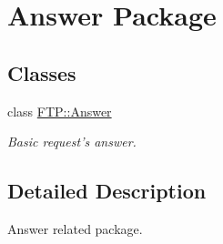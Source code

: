 \hypertarget{group__answer}{\section{Answer Package}
\label{group__answer}
}
\subsection*{Classes}
\begin{DoxyCompactItemize}
\item 
class \hyperlink{classFTP_1_1Answer}{F\-T\-P\-::\-Answer}
\begin{DoxyCompactList}\small\item\em Basic request's answer. \end{DoxyCompactList}\end{DoxyCompactItemize}


\subsection{Detailed Description}
Answer related package. 